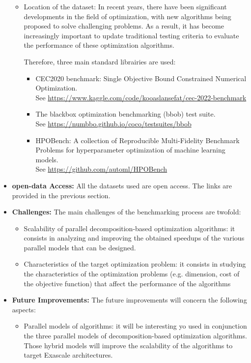 \begin{itemize}
\begin{itemize}
\item Location of the dataset: In recent years, there have been significant developments in the field of optimization, with new algorithms being proposed to solve challenging problems. As a result, it has become increasingly important to update traditional testing criteria to evaluate the performance of these optimization algorithms. 

Therefore, three main standard librairies are used:
\begin{itemize}
\item CEC2020 benchmark: Single Objective Bound Constrained Numerical Optimization. \\
See \url{https://www.kaggle.com/code/kooaslansefat/cec-2022-benchmark}
\item The blackbox optimization benchmarking (bbob) test suite. \\
See \url{https://numbbo.github.io/coco/testsuites/bbob}
\item HPOBench: A collection of Reproducible Multi-Fidelity Benchmark Problems for hyperparameter optimization of machine learning models. \\
See \url{https://github.com/automl/HPOBench}
\end{itemize}
\end{itemize}

\item \textbf{open-data Access:} All the datasets used are open access. The links are provided in the previous section.

\item \textbf{Challenges:} The main challenges of the benchmarking process are twofold:
\begin{itemize}
\item Scalability of parallel decomposition-based optimization algorithms: it consists in analyzing and improving the obtained speedups of the various parallel models that can be designed.
\item Characteristics of the target optimization problem: it consists in studying the characteristics of the optimization problems (e.g. dimension, cost of the objective function) that affect the performance of the algorithms 
\end{itemize}

\item \textbf{Future Improvements:} The future improvements will concern the following aspects:
\begin{itemize}
\item Parallel models of algorithms: it will be interesting yo used in conjunction the three parallel models of decomposition-based optimization algorithms. Those hybrid models will improve the scalability of the algorithms to target Exascale architectures.


\end{itemize}
\end{itemize}
